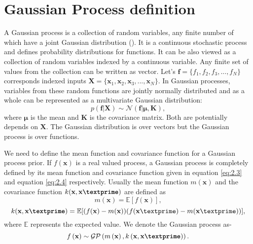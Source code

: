 \section{Gaussian Process definition}
A Gaussian process is a collection of random variables, any finite number of which have a joint Gaussian distribution (\cite{Rasmussen_and_Williams:2006}). It is a continuous stochastic process and defines probability distributions for functions. It can be also viewed as a collection of random variables indexed by a continuous variable. Any finite set of values from the collection can be written as vector. Let's $ \textbf{f} = \{ f_1, f_2, f_3,..., f_N\}$ corresponds indexed inputs $ \textbf{X} = \{ \textbf{x}_1, \textbf{x}_2, \textbf{x}_3,..., \textbf{x}_N\}$. In Gaussian processes, variables from these random functions are jointly normally distributed and as a whole can be represented as a multivariate Gaussian distribution:
\begin{equation} \label{eq:2.2}
p(\textbf{f}|\textbf{X})\sim \mathcal{N}\left(\textbf{f}|\boldsymbol\mu,\textbf{K}\right),
\end{equation}
where $\boldsymbol\mu$ is the mean and $\textbf{K}$ is the covariance matrix. Both are potentially depends on $\textbf{X}$. The Gaussian distribution is over vectors but the Gaussian process is over functions.

We need to define the mean function and covariance function for a Gaussian process prior. If $f(\textbf{x})$ is a real valued process, a Gaussian process is completely defined by its mean function and covariance function given in equation \ref{eq:2.3} and equation \ref{eq:2.4} respectively. Usually the mean function $m(\textbf{x})$  and the covariance function $k(\textbf{x},\textbf{x\textprime})$ are defined as
\begin{equation} \label{eq:2.3}
m(\textbf{x})= \mathbb{E}[f(\textbf{x})],
\end{equation}
\begin{equation} \label{eq:2.4}
k(\textbf{x},\textbf{x\textprime})= 
\mathbb{E}[(f(\textbf{x})-m(\textbf{x}))(f(\textbf{x}\textprime)-m(\textbf{x}\textprime))],
\end{equation}
where $\mathbb{E}$ represents the expected value. We denote the Gaussian process as-
\begin{equation} \label{eq:GP}
f\left(\textbf{x} \right)\sim \mathcal{GP} \left(m \left(\textbf{x}\right), k \left(\textbf{x},\textbf{x\textprime}\right) \right).
\end{equation}

